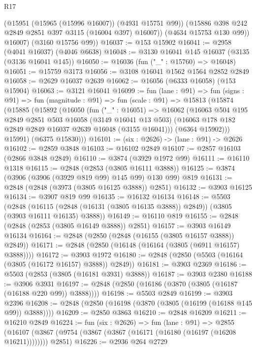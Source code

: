\begin{lexlean}{R17}
\begin{coremodule}
            (@15951 (@15965 (@15996 @16007)) (@4931 @15751 @99))
            (@15886 @398 @242 @2849 @2851 @397 @3115 (@16004 @397) @16007))
          (@4634 @15753 @130 @99))
        @16007)
      (@3160 @15756 @99))
@16037 := @153 @15902
@16041 := @2958 (@4041 @16037) (@4046 @6638)
@16048 := @3130 @16041 @145 @16037 (@3135 (@3136 @16041 @145))
@16050 := @16036 (fun ("_" : @15760) => @16048)
@16051 := @15759 @3173
@16056 := @3108 @16041 @1562 @1564 @2852 @2849
@16058 := @2629 @16037 @2639
@16062 := @16056 (@6333 @16058) (@153 @15904)
@16063 := @3121 @16041
@16099 := fun (lane : @91) =>
  fun (signs : @91) =>
  fun (magnitude : @91) =>
  fun (scale : @91) =>
  @15813
    (@15874
      (@15885
        (@15892
          (@16050
            (fun ("_" : @16051) =>
            @16062
              (@16063
                @504
                @195
                @2849
                @2851
                @503
                @16058
                (@3149 @16041 @13 @503)
                (@16063 @178 @182 @2849 @2849 @16037 @2639 @16048 (@3155 @16041)))
              (@6364 @15902)))
          @15991)
        (@6375 @15830)))
@16101 := (six : @2626) -> (lane : @91) -> @2626
@16102 := @2859 @3848
@16103 := @16102 @2849
@16107 := @2857 @16103 (@2866 @3848 @2849)
@16110 := @3874 (@3929 @1972 @99)
@16111 := @16110 @1318
@16115 := @2848 (@2853 (@3805 @16111 @3888))
@16125 := @3874 (@3906 (@3906 (@3929 @819 @99) @145 @99) @130 @99) @819
@16131 := @2848 (@2848 (@3973 (@3805 @16125 @3888)) @2851)
@16132 := @3903 @16125
@16134 := @3907 @819 @99
@16135 := @16132 @16134
@16148 := @5503
    (@2848 (@16115 (@2848 (@16131 (@3805 @16135 @3888)) @2849)) (@3805 (@3903 @16111 @16135) @3888))
@16149 := @16110 @819
@16155 := @2848 (@2848 (@2853 (@3805 @16149 @3888)) @2851)
@16157 := @3903 @16149 @16134
@16164 := @2848 (@2850 (@2848 (@16155 (@3805 @16157 @3888)) @2849))
@16171 := @2848 (@2850 (@16148 (@16164 (@3805 (@6911 @16157) @3888))))
@16172 := @3903 @1972
@16180 := @2848 (@2850 (@5503 (@16164 (@3805 (@16172 @16157) @3888)) @2849))
@16181 := @3903 @2369
@16186 := @5503 (@2853 (@3805 (@16181 @3931) @3888))
@16187 := @3903 @2380
@16188 := @3906 @3931
@16197 := @2848 (@2850 (@16186 (@3870 (@3805 (@16187 (@16188 @220 @99)) @3888))))
@16198 := @5503 @2849
@16199 := @3903 @2396
@16208 := @2848 (@2850 (@16198 (@3870 (@3805 (@16199 (@16188 @145 @99)) @3888))))
@16209 := @2850 @3863
@16210 := @2848 @16209
@16211 := @16210 @2849
@16224 := fun (six : @2626) =>
  fun (lane : @91) =>
  @2855 (@16107 (@3867 (@9754 (@3867 (@3867 (@16171 (@16180 (@16197 (@16208 @16211)))))))) @2851)
@16226 := @2936 @264 @2729

\end{coremodule}
\end{lexlean}
